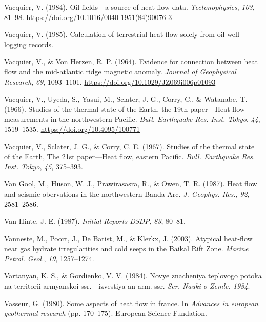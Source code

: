 \begin{CSLReferences}{1}{1}
\leavevmode{}%
Vacquier, V. (1984). Oil fields - a source of heat flow data. \emph{Tectonophysics}, \emph{103}, 81--98. \url{https://doi.org/10.1016/0040-1951(84)90076-3}

\leavevmode{}%
Vacquier, V. (1985). Calculation of terrestrial heat flow solely from oil well logging records.

\leavevmode{}%
Vacquier, V., \& Von Herzen, R. P. (1964). Evidence for connection between heat flow and the mid-atlantic ridge magnetic anomaly. \emph{Journal of Geophysical Research}, \emph{69}, 1093--1101. \url{https://doi.org/10.1029/JZ069i006p01093}

\leavevmode{}%
Vacquier, V., Uyeda, S., Yasui, M., Sclater, J. G., Corry, C., \& Watanabe, T. (1966). Studies of the thermal state of the {Earth, the 19th paper---Heat flow measurements in the northwestern Pacific}. \emph{Bull. Earthquake Res. Inst. Tokyo}, \emph{44}, 1519--1535. \url{https://doi.org/10.4095/100771}

\leavevmode{}%
Vacquier, V., Sclater, J. G., \& Corry, C. E. (1967). Studies of the thermal state of the {Earth, The 21st paper---Heat flow, eastern Pacific}. \emph{Bull. Earthquake Res. Inst. Tokyo}, \emph{45}, 375--393.

\leavevmode{}%
Van Gool, M., Huson, W. J., Prawirasasra, R., \& Owen, T. R. (1987). Heat flow and seismic obervations in the northwestern {Banda Arc}. \emph{J. Geophys. Res.}, \emph{92}, 2581--2586.

\leavevmode{}%
Van Hinte, J. E. (1987). \emph{Initial Reports DSDP}, \emph{83}, 80--81.

\leavevmode{}%
Vanneste, M., Poort, J., De Batist, M., \& Klerkx, J. (2003). Atypical heat-flow near gas hydrate irregularities and cold seeps in the {Baikal Rift Zone}. \emph{Marine Petrol. Geol.}, \emph{19}, 1257--1274.

\leavevmode{}%
Vartanyan, K. S., \& Gordienko, V. V. (1984). Novye znacheniya teplovogo potoka na territorii armyanskoi ssr. - izvestiya an arm. ssr. \emph{Ser. Nauki o Zemle. 1984}.

\leavevmode{}%
Vasseur, G. (1980). Some aspects of heat flow in france. In \emph{Advances in european geothermal research} (pp. 170--175). European Science Fundation.


\end{CSLReferences}
